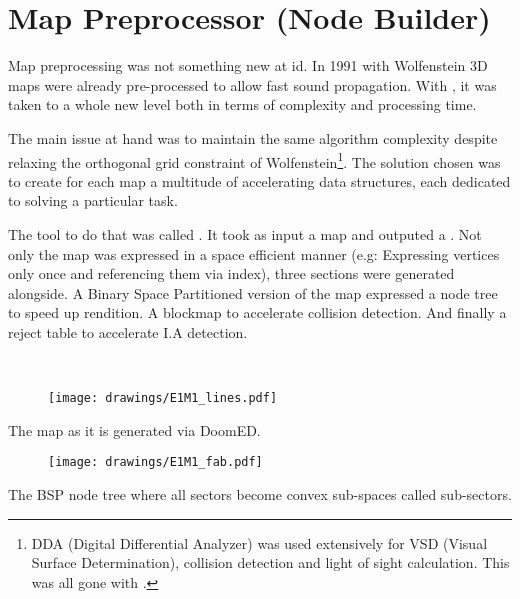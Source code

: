 \section{Map Preprocessor (Node Builder)}
Map preprocessing was not something new at id. In 1991 with Wolfenstein 3D maps were already pre-processed to allow fast sound propagation. With \doom, it was taken to a whole new level both in terms of complexity and processing time.\\
\par
The main issue at hand was to maintain the same algorithm complexity despite relaxing the orthogonal grid constraint of Wolfenstein\footnote{DDA (Digital Differential Analyzer) was used extensively for VSD (Visual Surface Determination), collision detection and light of sight calculation. This was all gone with \doom.}. The solution chosen was to create for each map a multitude of accelerating data structures, each dedicated to solving a particular task.\\
\par
 The tool to do that was called . It took as input a  map and outputed a . Not only the map was expressed in a space efficient manner (e.g: Expressing vertices only once and referencing them via index), three sections were generated alongside. A Binary Space Partitioned version of the map expressed a node tree to speed up rendition. A blockmap to accelerate collision detection. And finally a reject table to accelerate I.A detection.\\
 \par
{}\\
\par
{}
\par


%
\begin{figure}[H]
\vspace*{3mm}
\centering
\texttt{[image: drawings/E1M1\_lines.pdf]}
\end{figure}
\par
The map as it is generated via DoomED.\\
\par
\begin{figure}[H]
\vspace*{2mm}
\centering
\texttt{[image: drawings/E1M1\_fab.pdf]}
\end{figure}
The BSP node tree where all sectors become convex sub-spaces called sub-sectors.



